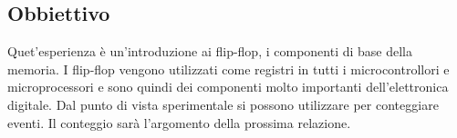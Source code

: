 \subsection{Obbiettivo}

Quet'esperienza è un'introduzione ai flip-flop, i componenti di base della memoria.
I flip-flop vengono utilizzati come registri in tutti i microcontrollori e microprocessori
e sono quindi dei componenti molto importanti dell'elettronica digitale.
Dal punto di vista sperimentale si possono utilizzare per conteggiare eventi.
Il conteggio sarà l'argomento della prossima relazione.
